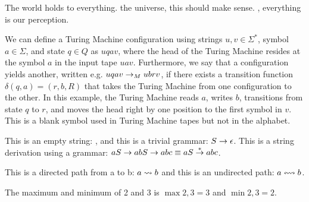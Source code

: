 \documentclass{article}
\begin{document}
\begin{solution}
    \par The world holds \WLOG to everything. \Wrt the universe, this should make sense. \Wlog, everything is  \wrt our perception.
    \par We can define a Turing Machine configuration using strings $u,v \in \Sigma^*$, symbol $a \in \Sigma$, and state $q \in Q$ as $uqav$, where the head of the Turing Machine resides at the symbol $a$ in the input tape $uav$. Furthermore, we say that a configuration yields another, written e.g. $uqav \rightarrow_M ubrv$, if there exists a transition function $\delta(q, a) = (r, b, R)$ that takes the Turing Machine from one configuration to the other. In this example, the Turing Machine reads $a$, writes $b$, transitions from state $q$ to $r$, and moves the head right by one position to the first symbol in $v$. This \blanksymbol is a blank symbol used in Turing Machine tapes but not in the alphabet.
    \par This is an empty string: \emptystring, and this is a trivial grammar: $S \rightarrow \epsilon$. This is a string derivation using a grammar: $aS \rightarrow abS \rightarrow abc \equiv aS \stackrel{*}{\rightarrow} abc$.
    \par This is a directed path from a to b: $a \rightsquigarrow b$ and this is an undirected path: $a \leftrightsquigarrow b$.
    \par The maximum and minimum of 2 and 3 is $\max{2,3} = 3$ and $\min{2,3} = 2$.
\end{solution}
\end{document}
